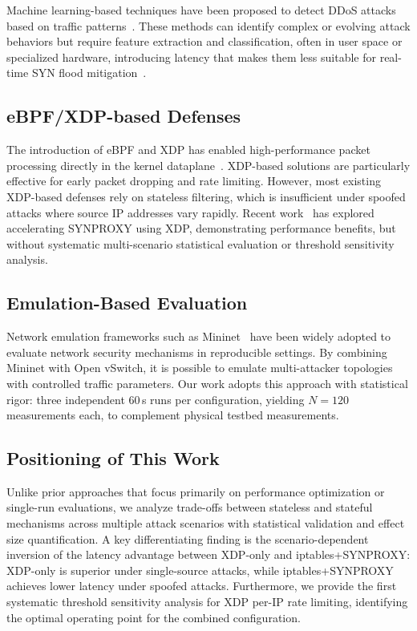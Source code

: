 \documentclass[conference]{IEEEtran}
\begin{document}
Machine learning-based techniques have been proposed to detect DDoS attacks
based on traffic patterns~\cite{CNN_ddos,dimolianis2022,sidoretti2023}.
These methods can identify complex or evolving attack behaviors but require
feature extraction and classification, often in user space or specialized
hardware, introducing latency that makes them less suitable for real-time
SYN flood mitigation~\cite{applsci13}.

\subsection{eBPF/XDP-based Defenses}

The introduction of eBPF and XDP has enabled high-performance packet
processing directly in the kernel
dataplane~\cite{HighPerfXDP,VanWieren2019}.
XDP-based solutions are particularly effective for early packet dropping
and rate limiting.
However, most existing XDP-based defenses rely on stateless filtering,
which is insufficient under spoofed attacks where source IP addresses
vary rapidly.
Recent work~\cite{NVidiaSynFlood} has explored accelerating SYNPROXY using
XDP, demonstrating performance benefits, but without systematic
multi-scenario statistical evaluation or threshold sensitivity analysis.

\subsection{Emulation-Based Evaluation}

Network emulation frameworks such as Mininet~\cite{mininet} have been
widely adopted to evaluate network security mechanisms in reproducible
settings.
By combining Mininet with Open vSwitch, it is possible to emulate
multi-attacker topologies with controlled traffic parameters.
Our work adopts this approach with statistical rigor: three independent
60\,s runs per configuration, yielding $N=120$ measurements each, to
complement physical testbed measurements.

\subsection{Positioning of This Work}

Unlike prior approaches that focus primarily on performance optimization
or single-run evaluations, we analyze trade-offs between stateless and
stateful mechanisms across multiple attack scenarios with statistical
validation and effect size quantification.
A key differentiating finding is the scenario-dependent inversion of the
latency advantage between XDP-only and iptables+SYNPROXY: XDP-only is
superior under single-source attacks, while iptables+SYNPROXY achieves
lower latency under spoofed attacks.
Furthermore, we provide the first systematic threshold sensitivity analysis
for XDP per-IP rate limiting, identifying the optimal operating point for
the combined configuration.
\end{document}
